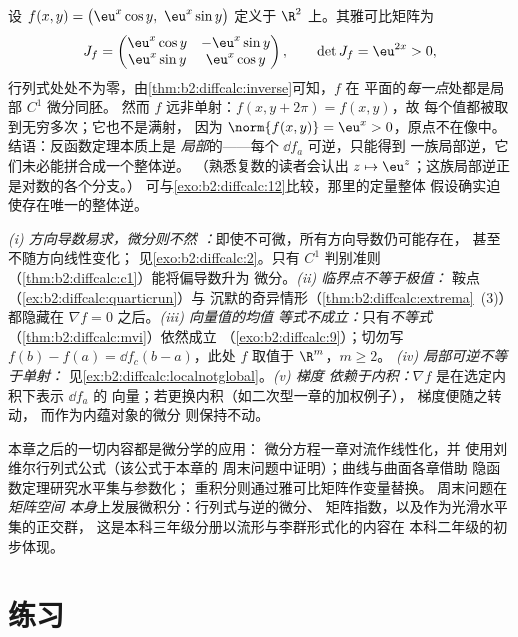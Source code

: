 \begin{example}\label{ex:b2:diffcalc:localnotglobal}
设 $f(x, y) = \bigl(\eu^x\cos y,\ \eu^x\sin y\bigr)$ 定义于
$\R^2$ 上。其雅可比矩阵为
\[
J_f = \begin{pmatrix}
\eu^x\cos y & -\eu^x\sin y\\
\eu^x\sin y & \eu^x\cos y
\end{pmatrix},
\qquad
\det J_f = \eu^{2x} > 0 ,
\]
行列式处处不为零，由\cref{thm:b2:diffcalc:inverse}可知，$f$ 在
平面的\emph{每一点}处都是局部 $C^1$ 微分同胚。
然而 $f$ 远非单射：$f(x, y + 2\pi) = f(x, y)$，故
每个值都被取到无穷多次；它也不是满射，
因为 $\norm{f(x, y)} = \eu^x > 0$，原点不在像中。
结语：反函数定理本质上是
\emph{局部}的——每个 $\dd f_a$ 可逆，只能得到
一族局部逆，它们未必能拼合成一个整体逆。
（熟悉复数的读者会认出 $z \mapsto
\eu^z$；这族局部逆正是对数的各个分支。）
可与\cref{exo:b2:diffcalc:12}比较，那里的定量整体
假设确实迫使存在唯一的整体逆。
\end{example}

\begin{remark}[常见误区]
\emph{(i) 方向导数易求，微分则不然
：}即使不可微，所有方向导数仍可能存在，
甚至不随方向线性变化；
见\cref{exo:b2:diffcalc:2}。只有 $C^1$
判别准则
（\cref{thm:b2:diffcalc:c1}）能将偏导数升为
微分。\emph{(ii) 临界点不等于极值：}
鞍点（\cref{ex:b2:diffcalc:quarticrun}）与
沉默的奇异情形（\cref{thm:b2:diffcalc:extrema}~(3)）都隐藏在
$\nabla f = 0$ 之后。\emph{(iii) 向量值的均值
等式不成立：}只有\emph{不等式}
（\cref{thm:b2:diffcalc:mvi}）依然成立
（\cref{exo:b2:diffcalc:9}）；切勿写 $f(b) - f(a) = \dd
f_c(b-a)$，此处 $f$ 取值于 $\R^m$，$m \geq 2$。
\emph{(iv) 局部可逆不等于单射：}
见\cref{ex:b2:diffcalc:localnotglobal}。\emph{(v) 梯度
依赖于内积：}$\nabla f$ 是在选定内积下表示 $\dd f_a$ 的
向量；若更换内积（如二次型一章的加权例子），
梯度便随之转动，
而作为内蕴对象的微分
则保持不动。
\end{remark}

\begin{remark}[应用场合]
本章之后的一切内容都是微分学的应用：
微分方程一章对流作线性化，并
使用刘维尔行列式公式（该公式于本章的
周末问题中证明）；曲线与曲面各章借助
隐函数定理研究水平集与参数化；
重积分则通过雅可比矩阵作变量替换。
周末问题在\emph{矩阵空间
本身}上发展微积分：行列式与逆的微分、
矩阵指数，以及作为光滑水平集的正交群，
这是本科三年级分册以流形与李群形式化的内容在
本科二年级的初步体现。
\end{remark}

\section{练习}

